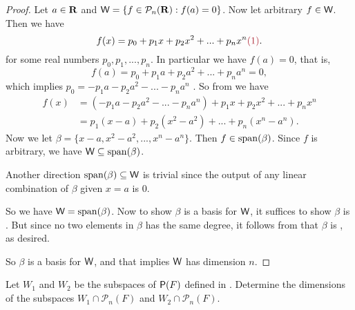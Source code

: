 \begin{proof}
Let \(a \in \mathbf{R}\) and \(\textsf{W} = \{ f \in \mathcal{P}_n(\mathbf{R}) : f(a) = 0 \}\).
Now let arbitrary \(f \in \textsf{W}\).
Then we have
\[
    f(x) = p_0 + p_1 x + p_2 x^2 + ... + p_n x^n \MAROON{(1)}.
\]
for some real numbers \(p_0, p_1, ..., p_n\).
In particular we have \(f(a) = 0\), that is,
\[
    f(a) = p_0 + p_1 a + p_2 a^2 + ... + p_n a^n = 0,
\]
which implies \(p_0 = -p_1 a - p_2 a^2 - ... - p_n a^n\) .
So from  we have
\begin{align*}
    f(x) & = (-p_1 a - p_2 a^2 - ... - p_n a^n) + p_1 x + p_2 x^2 + ... + p_n x^n \\
         & = p_1(x - a) + p_2(x^2 - a^2) + ... + p_n (x^n - a^n).
\end{align*}
Now we let \(\beta = \{ x - a, x^2 - a^2, ..., x^n - a^n \}\).
Then \(f \in \operatorname{span}(\beta)\).
Since \(f\) is arbitrary, we have \(\textsf{W} \subseteq \operatorname{span}(\beta)\).

Another direction \(\operatorname{span}(\beta) \subseteq \textsf{W}\) is trivial since the output of any linear combination of \(\beta\) given \(x = a\) is \(0\).

So we have \(\textsf{W} = \operatorname{span}(\beta)\).
Now to show \(\beta\) is a basis for \(\textsf{W}\), it suffices to show \(\beta\) is \LID{}.
But since no two elements in \(\beta\) has the same degree, it follows from  that \(\beta\) is \LID{}, as desired.

So \(\beta\) is a basis for \(\textsf{W}\), and that implies \(\textsf{W}\) has dimension \(n\).
\end{proof}

\begin{exercise} \label{exercise 1.6.27}
Let \(W_1\) and \(W_2\) be the subspaces of \(\textsf{P}(F)\) defined in .
Determine the dimensions of the subspaces \(W_1 \cap \mathcal{P}_n(F)\) and \(W_2 \cap \mathcal{P}_n(F)\).
\end{exercise}

